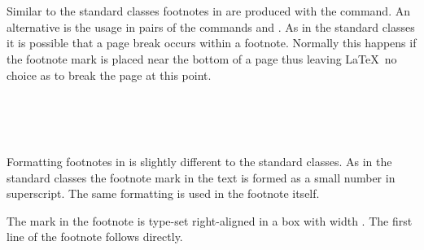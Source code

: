 \begin{Declaration}
  \\
  \\
\end{Declaration}%
%
%
%
Similar to the standard classes footnotes in {\KOMAScript} are
produced with the  command.
An alternative is the usage in pairs of the commands
 and .
As in the standard classes it is possible that a page break occurs
within a footnote. Normally this happens if the footnote mark is
placed near the bottom of a page thus leaving \LaTeX\ no choice as to
break the page at this point.
%
%
%
%


\begin{Declaration}
                     \\
  \\
  \\
\end{Declaration}%
%
%
%
%
Formatting footnotes in {\KOMAScript} is slightly different to the
standard classes. As in the standard classes the footnote mark in the
text is formed as a small number in superscript. The same formatting
is used in the footnote itself.

The mark in the footnote is type-set right-aligned in a box
with width . The first line of the footnote
follows directly.

